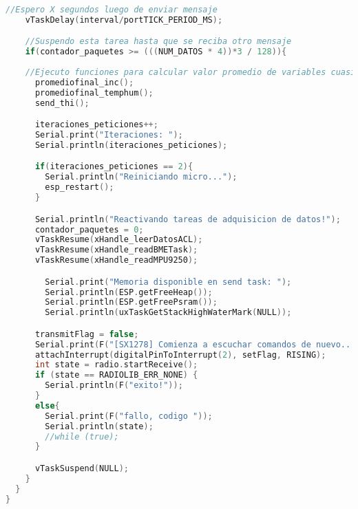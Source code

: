 \begin{lstlisting}[language=C++, caption=Tarea de envío de datos de aceleración desde sensor inteligente]
    //Espero X segundos luego de enviar mensaje
    vTaskDelay(interval/portTICK_PERIOD_MS);

    //Suspendo esta tarea hasta que se reciba otro mensaje
    if(contador_paquetes >= (((NUM_DATOS * 4))*3 / 128)){
      
    //Ejecuto funciones para calcular valor promedio de variables cuasiestaticas
      promediofinal_inc();
      promediofinal_temphum();
      send_thi();

      iteraciones_peticiones++;
      Serial.print("Iteraciones: ");
      Serial.println(iteraciones_peticiones);

      if(iteraciones_peticiones == 2){
        Serial.println("Reiniciando micro...");
        esp_restart();
      }

      Serial.println("Reactivando tareas de adquisicion de datos!");
      contador_paquetes = 0;
      vTaskResume(xHandle_leerDatosACL);
      vTaskResume(xHandle_readBMETask);
      vTaskResume(xHandle_readMPU9250);

        Serial.print("Memoria disponible en send task: ");
        Serial.println(ESP.getFreeHeap());
        Serial.println(ESP.getFreePsram());
        Serial.println(uxTaskGetStackHighWaterMark(NULL));

      transmitFlag = false; 
      Serial.print(F("[SX1278] Comienza a escuchar comandos de nuevo... "));
      attachInterrupt(digitalPinToInterrupt(2), setFlag, RISING);
      int state = radio.startReceive();
      if (state == RADIOLIB_ERR_NONE) {
        Serial.println(F("exito!"));
      } 
      else{
        Serial.print(F("fallo, codigo "));
        Serial.println(state);
        //while (true);
      }

      vTaskSuspend(NULL);
    }
  }  
}

\end{lstlisting}

